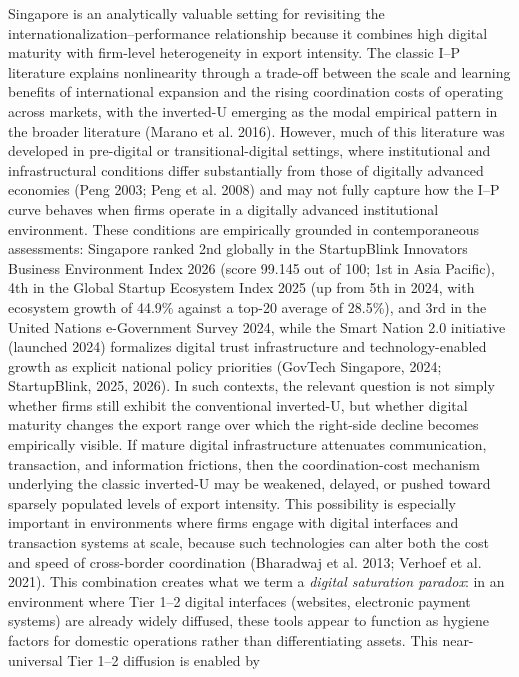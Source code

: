 \documentclass[12pt,a4paper]{article}
\begin{document}
Singapore is an analytically valuable setting for revisiting the
internationalization--performance relationship because it combines high
digital maturity with firm-level heterogeneity in export intensity. The
classic I--P literature explains nonlinearity through a trade-off
between the scale and learning benefits of international expansion and
the rising coordination costs of operating across markets, with the
inverted-U emerging as the modal empirical pattern in the broader
literature (Marano et al. 2016). However, much of this literature was
developed in pre-digital or transitional-digital settings, where
institutional and infrastructural conditions differ substantially from
those of digitally advanced economies (Peng 2003; Peng et al. 2008) and
may not fully capture how the I--P curve behaves when firms operate in a
digitally advanced institutional environment. These conditions are
empirically grounded in contemporaneous assessments: Singapore ranked
2nd globally in the StartupBlink Innovators Business Environment Index
2026 (score 99.145 out of 100; 1st in Asia Pacific), 4th in the Global
Startup Ecosystem Index 2025 (up from 5th in 2024, with ecosystem growth
of 44.9\% against a top-20 average of 28.5\%), and 3rd in the United
Nations e-Government Survey 2024, while the Smart Nation 2.0 initiative
(launched 2024) formalizes digital trust infrastructure and
technology-enabled growth as explicit national policy priorities
(GovTech Singapore, 2024; StartupBlink, 2025, 2026). In such contexts,
the relevant question is not simply whether firms still exhibit the
conventional inverted-U, but whether digital maturity changes the export
range over which the right-side decline becomes empirically visible. If
mature digital infrastructure attenuates communication, transaction, and
information frictions, then the coordination-cost mechanism underlying
the classic inverted-U may be weakened, delayed, or pushed toward
sparsely populated levels of export intensity. This possibility is
especially important in environments where firms engage with digital
interfaces and transaction systems at scale, because such technologies
can alter both the cost and speed of cross-border coordination
(Bharadwaj et al. 2013; Verhoef et al. 2021). This combination creates
what we term a \emph{digital saturation paradox}: in an environment
where Tier 1--2 digital interfaces (websites, electronic payment
systems) are already widely diffused, these tools appear to function as
hygiene factors for domestic operations rather than differentiating
assets. This near-universal Tier 1--2 diffusion is enabled by
\end{document}
